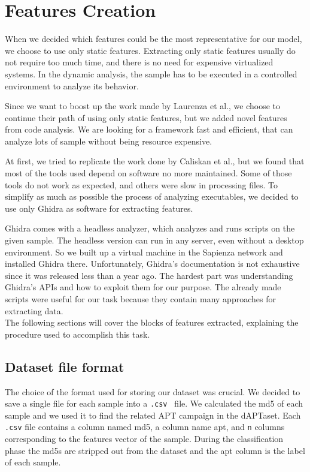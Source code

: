 \chapter{Features Creation}

When we decided which features could be the most representative for our model, we choose to use only static features. Extracting only static features usually do not require too much time, and there is no need for expensive virtualized systems. In the dynamic analysis, the sample has to be executed in a controlled environment to analyze its behavior. 

Since we want to boost up the work made by Laurenza et al., we choose to continue their path of using only static features, but we added novel features from code analysis.  We are looking for a framework fast and efficient, that can analyze lots of sample without being resource expensive.

At first, we tried to replicate the work done by Caliskan et al., but we found that most of the tools used depend on software no more maintained. Some of those tools do not work as expected, and others were slow in processing files. To simplify as much as possible the process of analyzing executables, we decided to use only Ghidra as software for extracting features.

Ghidra comes with a headless analyzer, which analyzes and runs scripts on the given sample. The headless version can run in any server, even without a desktop environment. So we built up a virtual machine in the Sapienza network and installed Ghidra there.  Unfortunately, Ghidra's documentation is not exhaustive since it was released less than a year ago. The hardest part was understanding Ghidra's APIs and how to exploit them for our purpose. The already made scripts were useful for our task because they contain many approaches for extracting data. \\



The following sections will cover the blocks of features extracted, explaining the procedure used to accomplish this task.

\section{Dataset file format}
The choice of the format used for storing our dataset was crucial.
We decided to save a single file for each sample into a \texttt{.csv } file. We calculated the md5 of each sample and we used it to find the related APT campaign in the dAPTaset. Each \texttt{.csv} file contains a column named md5, a column name apt, and \texttt{n} columns corresponding to the features vector of the sample. During the classification phase the md5s are stripped out from the dataset and the apt column is the label of each sample.

